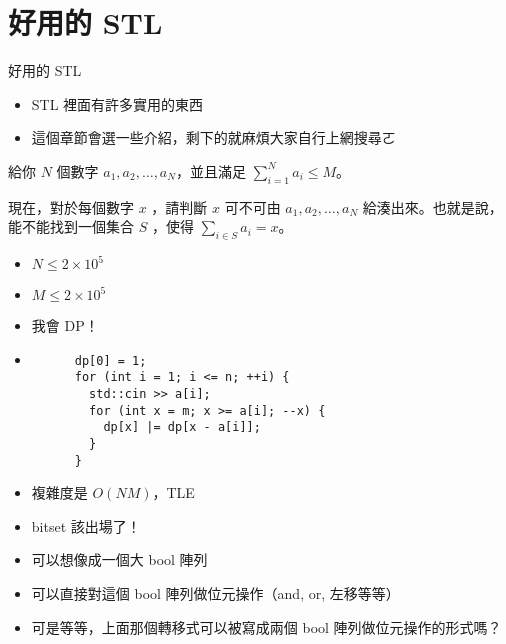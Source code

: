 \documentclass[standalone]{beamer}
\begin{document}
\section{好用的 STL}

\begin{frame}{好用的 STL}
  \begin{itemize}
    \item STL 裡面有許多實用的東西
    \item 這個章節會選一些介紹，剩下的就麻煩大家自行上網搜尋ㄛ
  \end{itemize}
\end{frame}

\begin{frame}{}
  \begin{problem}
    給你 $N$ 個數字 $a_1, a_2, \dots, a_N$，並且滿足 $\sum_{i = 1}^{N} a_i \le M$。

    現在，對於每個數字 $x$ ，請判斷 $x$ 可不可由 $a_1, a_2, \dots, a_N$ 給湊出來。也就是說，能不能找到一個集合 $S$ ，使得 $\sum_{i \in S} a_i = x$。

    \begin{itemize}
        \item $N \leq 2 \times 10^5$
        \item $M \leq 2 \times 10^5$
    \end{itemize}
  \end{problem}
\end{frame}

\begin{frame}[fragile]{}
  \begin{itemize}
    \item 我會 DP！
    \item
    \begin{verbatim}
      dp[0] = 1;
      for (int i = 1; i <= n; ++i) {
        std::cin >> a[i];
        for (int x = m; x >= a[i]; --x) {
          dp[x] |= dp[x - a[i]];
        }
      }
    \end{verbatim}
    \item 複雜度是 $O(NM)$，TLE
    \item bitset 該出場了！ 
  \end{itemize}
\end{frame}

\begin{frame}{}
  \begin{itemize}
    \item 可以想像成一個大 bool 陣列
    \item 可以直接對這個 bool 陣列做位元操作（and, or, 左移等等）
    \item 可是等等，上面那個轉移式可以被寫成兩個 bool 陣列做位元操作的形式嗎？
  \end{itemize}
\end{frame}
\end{document}

